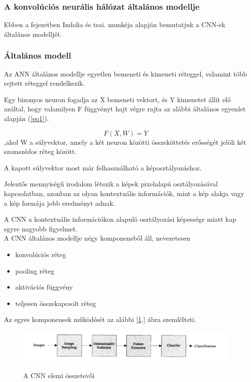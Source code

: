 \documentclass[12pt,a4]{article}
\begin{document}
	\subsubsection{A konvolúciós neurális hálózat általános modellje}
    Ebben a fejezetben Indolia és tsai. \cite{CNN} munkéja alapján bemutatjuk a CNN-ek általános modelljét.
 
	\subsubsection{Általános modell}
	Az ANN általános modellje egyetlen bemeneti és kimeneti réteggel,
	valamint több rejtett réteggel rendelkezik.
	
	Egy bizonyos 
	neuron fogadja az X bemeneti vektort, és Y kimenetet állít elő azáltal,
	hogy valamilyen F függvényt hajt végre rajta az alábbi általános egyenlet alapján (\ref{eq1}).
	\begin{mdframed}
	\begin{equation}
    \label{eq1}
			F(X, W) = Y
	\end{equation}
	,ahol W a súlyvektor, amely a két neuron közötti összeköttetés erősségét jelöli két szomszédos réteg között.
 	\end{mdframed}

	A kapott súlyvektor most már felhasználható a képosztályozáshoz.
	
	Jelentős mennyiségű irodalom létezik a képek pixelalapú osztályozásával
	kapcsolatban, azonban az olyan kontextuális információk, mint a kép alakja vagy 
	a kép formája jobb eredményt adnak.
	
	A CNN a kontextuális információkon alapuló osztályozási képessége miatt kap egyre nagyobb figyelmet.\\
	
	
	A CNN általános modellje négy komponensből áll, nevezetesen 
	\begin{itemize}
		\item konvolúciós réteg
		\item pooling réteg
		\item aktivációs függvény
		\item teljesen összekapcsolt réteg
	\end{itemize}
	Az egyes komponensek működését az alábbi [\ref{fig:cnnelem}.] ábra szemlélteti.
	
	\begin{figure}[h]	
		\centering
		\includegraphics[width=1\linewidth]{element}
        \label{fig:cnnelem}
		\caption{\cite{CNN} A CNN elemi összetevői}
	\end{figure}
\end{document}
